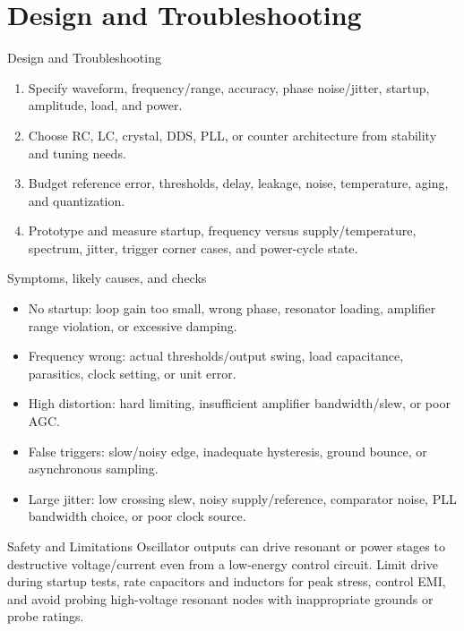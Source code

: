 \documentclass[10pt,letterpaper]{article}
\begin{document}
\section{Design and Troubleshooting}
\begin{CornellExamBox}{Design and Troubleshooting}
\begin{enumerate}
  \item Specify waveform, frequency/range, accuracy, phase noise/jitter, startup, amplitude, load, and power.
  \item Choose RC, LC, crystal, DDS, PLL, or counter architecture from stability and tuning needs.
  \item Budget reference error, thresholds, delay, leakage, noise, temperature, aging, and quantization.
  \item Prototype and measure startup, frequency versus supply/temperature, spectrum, jitter, trigger corner cases, and power-cycle state.
\end{enumerate}\end{CornellExamBox}
\begin{CornellExamBox}{Symptoms, likely causes, and checks}
\begin{itemize}
  \item No startup: loop gain too small, wrong phase, resonator loading, amplifier range violation, or excessive damping.
  \item Frequency wrong: actual thresholds/output swing, load capacitance, parasitics, clock setting, or unit error.
  \item High distortion: hard limiting, insufficient amplifier bandwidth/slew, or poor AGC.
  \item False triggers: slow/noisy edge, inadequate hysteresis, ground bounce, or asynchronous sampling.
  \item Large jitter: low crossing slew, noisy supply/reference, comparator noise, PLL bandwidth choice, or poor clock source.
\end{itemize}\end{CornellExamBox}
\begin{CornellWarningBox}{Safety and Limitations}
Oscillator outputs can drive resonant or power stages to destructive voltage/current even from a low-energy control circuit. Limit drive during startup tests, rate capacitors and inductors for peak stress, control EMI, and avoid probing high-voltage resonant nodes with inappropriate grounds or probe ratings.
\end{CornellWarningBox}
\end{document}
